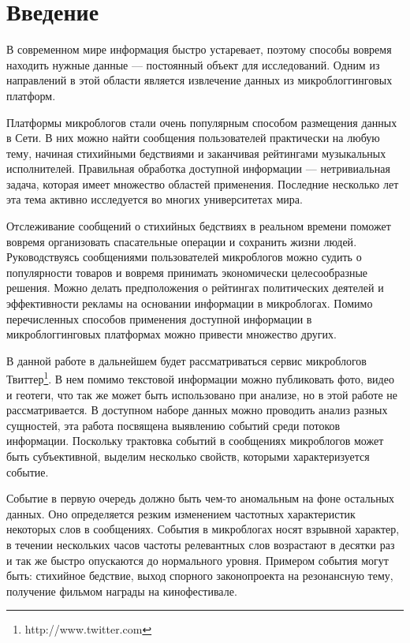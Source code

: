 \documentclass[12pt, a4paper]{article}
\begin{document}
  \section{Введение}
  	В современном мире информация быстро устаревает, поэтому способы вовремя находить нужные данные --- постоянный объект для исследований. Одним из направлений в этой области является извлечение данных из микроблоггинговых платформ.
  	
  	Платформы микроблогов стали очень популярным способом размещения данных в Сети. В них можно найти сообщения пользователей практически на любую тему, начиная стихийными бедствиями и заканчивая рейтингами музыкальных исполнителей. Правильная обработка доступной информации --- нетривиальная задача, которая имеет множество областей применения. Последние несколько лет эта тема активно исследуется во многих университетах мира.
  	
	Отслеживание сообщений о стихийных бедствиях в реальном времени поможет вовремя организовать спасательные операции и сохранить жизни людей\cite{nuggets}. Руководствуясь сообщениями пользователей микроблогов можно судить о популярности товаров и вовремя принимать экономически целесообразные решения. Можно делать предположения о рейтингах политических деятелей и эффективности рекламы на основании информации в микроблогах. Помимо перечисленных способов применения доступной информации в микроблоггинговых платформах можно привести множество других.
	
	В данной работе в дальнейшем будет рассматриваться сервис микроблогов Твиттер\footnote{http://www.twitter.com}. В нем помимо текстовой информации можно публиковать фото, видео и геотеги, что так же может быть использовано при анализе, но в этой работе не рассматривается. В доступном наборе данных можно проводить анализ разных сущностей, эта работа посвящена выявлению событий среди потоков информации. Поскольку трактовка событий в сообщениях микроблогов может быть субъективной, выделим несколько свойств, которыми характеризуется событие.
	
	Событие в первую очередь должно быть чем-то аномальным на фоне остальных данных. Оно определяется резким изменением частотных характеристик некоторых слов в сообщениях. События в микроблогах носят взрывной характер, в течении нескольких часов частоты релевантных слов возрастают в десятки раз и так же быстро опускаются до нормального уровня. Примером события могут быть: стихийное бедствие, выход спорного законопроекта на резонансную тему, получение фильмом награды на кинофестивале.
	
\end{document}
